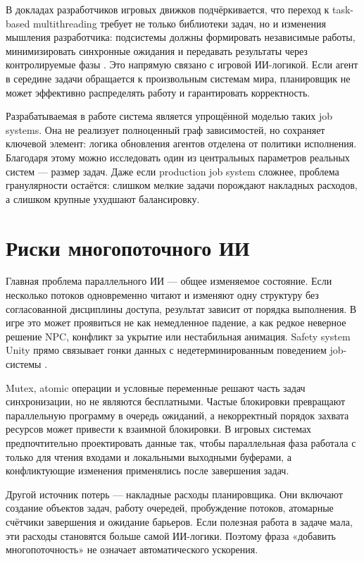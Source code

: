 \documentclass[14pt,a4paper,oneside]{extreport}
\begin{document}
В докладах разработчиков игровых движков подчёркивается, что переход к task-based multithreading требует не только библиотеки задач, но и изменения мышления разработчика: подсистемы должны формировать независимые работы, минимизировать синхронные ожидания и передавать результаты через контролируемые фазы \cite{gdc_naughty_fibers,gdc_task_based_multithreading}. Это напрямую связано с игровой ИИ-логикой. Если агент в середине задачи обращается к произвольным системам мира, планировщик не может эффективно распределять работу и гарантировать корректность.

Разрабатываемая в работе система является упрощённой моделью таких job systems. Она не реализует полноценный граф зависимостей, но сохраняет ключевой элемент: логика обновления агентов отделена от политики исполнения. Благодаря этому можно исследовать один из центральных параметров реальных систем --- размер задач. Даже если production job system сложнее, проблема гранулярности остаётся: слишком мелкие задачи порождают накладных расходов, а слишком крупные ухудшают балансировку.

\section{Риски многопоточного ИИ}

Главная проблема параллельного ИИ --- общее изменяемое состояние. Если несколько потоков одновременно читают и изменяют одну структуру без согласованной дисциплины доступа, результат зависит от порядка выполнения. В игре это может проявиться не как немедленное падение, а как редкое неверное решение NPC, конфликт за укрытие или нестабильная анимация. Safety system Unity прямо связывает гонки данных с недетерминированным поведением job-системы \cite{unity_safety_system}.

Mutex, atomic операции и условные переменные решают часть задач синхронизации, но не являются бесплатными. Частые блокировки превращают параллельную программу в очередь ожиданий, а некорректный порядок захвата ресурсов может привести к взаимной блокировки. В игровых системах предпочтительно проектировать данные так, чтобы параллельная фаза работала с только для чтения входами и локальными выходными буферами, а конфликтующие изменения применялись после завершения задач.

Другой источник потерь --- накладные расходы планировщика. Они включают создание объектов задач, работу очередей, пробуждение потоков, атомарные счётчики завершения и ожидание барьеров. Если полезная работа в задаче мала, эти расходы становятся больше самой ИИ-логики. Поэтому фраза «добавить многопоточность» не означает автоматического ускорения.
\end{document}
